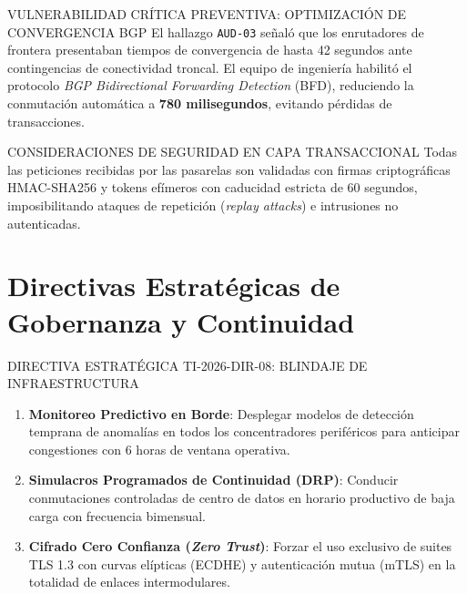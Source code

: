 \documentclass[11pt,letterpaper]{article}
\begin{document}
\begin{corpalert}{VULNERABILIDAD CR\'ITICA PREVENTIVA: OPTIMIZACI\'ON DE CONVERGENCIA BGP}
  El hallazgo \texttt{AUD-03} se\~nal\'o que los enrutadores de frontera presentaban tiempos de convergencia de hasta 42 segundos ante contingencias de conectividad troncal. El equipo de ingenier\'ia habilit\'o el protocolo \textit{BGP Bidirectional Forwarding Detection} (BFD), reduciendo la conmutaci\'on autom\'atica a \textbf{780 milisegundos}, evitando p\'erdidas de transacciones.
\end{corpalert}

\begin{corpnote}{CONSIDERACIONES DE SEGURIDAD EN CAPA TRANSACCIONAL}
  Todas las peticiones recibidas por las pasarelas son validadas con firmas criptogr\'aficas HMAC-SHA256 y tokens ef\'imeros con caducidad estricta de 60 segundos, imposibilitando ataques de repetici\'on (\textit{replay attacks}) e intrusiones no autenticadas.
\end{corpnote}

\newpage

\section{Directivas Estrat\'egicas de Gobernanza y Continuidad}

\begin{corpdirective}{DIRECTIVA ESTRAT\'EGICA TI-2026-DIR-08: BLINDAJE DE INFRAESTRUCTURA}
  \begin{enumerate}[leftmargin=1.5em, itemsep=3pt, topsep=2pt]
    \item \textbf{Monitoreo Predictivo en Borde}: Desplegar modelos de detecci\'on temprana de anomal\'ias en todos los concentradores perif\'ericos para anticipar congestiones con 6 horas de ventana operativa.
    \item \textbf{Simulacros Programados de Continuidad (DRP)}: Conducir conmutaciones controladas de centro de datos en horario productivo de baja carga con frecuencia bimensual.
    \item \textbf{Cifrado Cero Confianza (\textit{Zero Trust})}: Forzar el uso exclusivo de suites TLS 1.3 con curvas el\'ipticas (ECDHE) y autenticaci\'on mutua (mTLS) en la totalidad de enlaces intermodulares.
  \end{enumerate}
\end{corpdirective}
\end{document}
